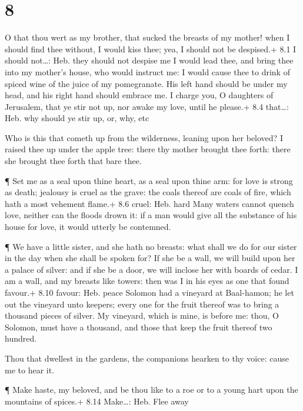 \hypertarget{section-7}{%
\section{8}\label{section-7}}

 O that thou wert as my brother, that sucked the breasts of
my mother! when I should find thee without, I would kiss thee; yea, I
should not be despised.+ 8.1 I should not\ldots: Heb. they should not
despise me  I would lead thee, and bring thee into my
mother's house, who would instruct me: I would cause thee to drink of
spiced wine of the juice of my pomegranate.  His left hand
should be under my head, and his right hand should embrace me.
 I charge you, O daughters of Jerusalem, that ye stir not
up, nor awake my love, until he please.+ 8.4 that\ldots: Heb. why should
ye stir up, or, why, etc

 Who is this that cometh up from the wilderness, leaning
upon her beloved? I raised thee up under the apple tree: there thy
mother brought thee forth: there she brought thee forth that bare thee.

 ¶ Set me as a seal upon thine heart, as a seal upon thine
arm: for love is strong as death; jealousy is cruel as the grave: the
coals thereof are coals of fire, which hath a most vehement flame.+ 8.6
cruel: Heb. hard  Many waters cannot quench love, neither
can the floods drown it: if a man would give all the substance of his
house for love, it would utterly be contemned.

 ¶ We have a little sister, and she hath no breasts: what
shall we do for our sister in the day when she shall be spoken for?
 If she be a wall, we will build upon her a palace of
silver: and if she be a door, we will inclose her with boards of cedar.
 I am a wall, and my breasts like towers: then was I in his
eyes as one that found favour.+ 8.10 favour: Heb. peace 
Solomon had a vineyard at Baal-hamon; he let out the vineyard unto
keepers; every one for the fruit thereof was to bring a thousand pieces
of silver.  My vineyard, which is mine, is before me: thou,
O Solomon, must have a thousand, and those that keep the fruit thereof
two hundred.

 Thou that dwellest in the gardens, the companions hearken
to thy voice: cause me to hear it.

 ¶ Make haste, my beloved, and be thou like to a roe or to
a young hart upon the mountains of spices.+ 8.14 Make\ldots: Heb. Flee
away
